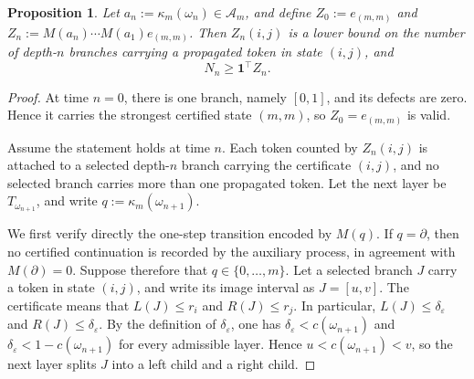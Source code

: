 \documentclass[11pt]{amsart}
\numberwithin{equation}{section}
\theoremstyle{plain}
\newtheorem{proposition}[theorem]{Proposition}
\theoremstyle{definition}
\theoremstyle{remark}
\begin{document}
\begin{proposition}\label{prop:Z-lower-bound}
Let \(a_n:=\kappa_m(\omega_n)\in\mathcal A_m\), and define \(Z_0:=e_{(m,m)}\) and \(Z_n:=M(a_n)\cdots M(a_1)e_{(m,m)}\). Then \(Z_n(i,j)\) is a lower bound on the number of depth-\(n\) branches carrying a propagated token in state \((i,j)\), and
\[
N_n\ge\mathbf 1^\top Z_n.
\]
\end{proposition}
\begin{proof}
At time \(n=0\), there is one branch, namely \([0,1]\), and its defects are
zero. Hence it carries the strongest certified state \((m,m)\), so
\(Z_0=e_{(m,m)}\) is valid.

Assume the statement holds at time \(n\). Each token counted by \(Z_n(i,j)\)
is attached to a selected depth-\(n\) branch carrying the certificate
\((i,j)\), and no selected branch carries more than one propagated token. Let
the next layer be \(T_{\omega_{n+1}}\), and write
\(q:=\kappa_m(\omega_{n+1})\).

We first verify directly the one-step transition encoded by \(M(q)\). If
\(q=\partial\), then no certified continuation is recorded by the auxiliary
process, in agreement with \(M(\partial)=0\). Suppose therefore that
\(q\in\{0,\dots,m\}\). Let a selected branch \(J\) carry a token in state
\((i,j)\), and write its image interval as \(J=[u,v]\). The certificate means
that \(L(J)\le r_i\) and \(R(J)\le r_j\). In particular,
\(L(J)\le\delta_\varepsilon\) and \(R(J)\le\delta_\varepsilon\). By the
definition of \(\delta_\varepsilon\), one has
\(\delta_\varepsilon<c(\omega_{n+1})\) and
\(\delta_\varepsilon<1-c(\omega_{n+1})\) for every admissible layer. Hence
\(u<c(\omega_{n+1})<v\), so the next layer splits \(J\) into a left child and
a right child.


\end{proof}
\end{document}
